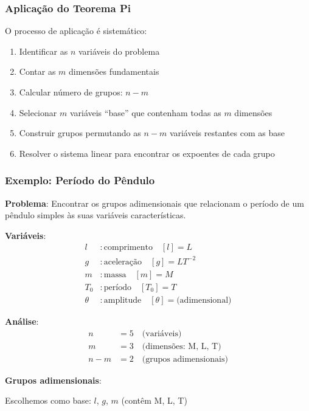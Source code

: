 \documentclass[12pt,a4paper,oneside]{book}
\theoremstyle{definition}
\begin{document}
\subsubsection{Aplicação do Teorema Pi}

O processo de aplicação é sistemático:

\begin{enumerate}
    \item Identificar as $n$ variáveis do problema
    \item Contar as $m$ dimensões fundamentais
    \item Calcular número de grupos: $n - m$
    \item Selecionar $m$ variáveis ``base'' que contenham todas as $m$ dimensões
    \item Construir grupos permutando as $n - m$ variáveis restantes com as base
    \item Resolver o sistema linear para encontrar os expoentes de cada grupo
\end{enumerate}

\subsubsection{Exemplo: Período do Pêndulo}

\textbf{Problema}: Encontrar os grupos adimensionais que relacionam o período de um pêndulo simples às suas variáveis características.

\textbf{Variáveis}:
\begin{align}
    l &: \text{comprimento} \quad [l] = L \\
    g &: \text{aceleração} \quad [g] = LT^{-2} \\
    m &: \text{massa} \quad [m] = M \\
    T_0 &: \text{período} \quad [T_0] = T \\
    \theta &: \text{amplitude} \quad [\theta] = \text{(adimensional)}
\end{align}

\textbf{Análise}:
\begin{align}
    n &= 5 \quad \text{(variáveis)} \\
    m &= 3 \quad \text{(dimensões: M, L, T)} \\
    n - m &= 2 \quad \text{(grupos adimensionais)}
\end{align}

\textbf{Grupos adimensionais}:

Escolhemos como base: $l$, $g$, $m$ (contêm M, L, T)
\end{document}
